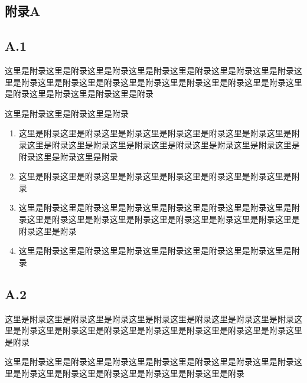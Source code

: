 \documentclass[UTF8,12pt,a4paper]{ctexart}
\begin{document}
\begin{appendices}
	\renewcommand{\appendixname}{附录}
	\appendixtitleon
	\section{附录A}
	\subsection*{A.1}

	这里是附录这里是附录这里是附录这里是附录这里是附录这里是附录这里是附录这里是附录这里是附录这里是附录这里是附录这里是附录这里是附录这里是附录这里是附录这里是附录这里是附录这里是附录

	这里是附录这里是附录这里是附录
	\begin{enumerate}
		\item 这里是附录这里是附录这里是附录这里是附录这里是附录这里是附录这里是附录这里是附录这里是附录这里是附录这里是附录这里是附录这里是附录这里是附录这里是附录这里是附录
		
		\item 这里是附录这里是附录这里是附录这里是附录这里是附录这里是附录这里是附录
		
		\item 这里是附录这里是附录这里是附录这里是附录这里是附录这里是附录这里是附录这里是附录这里是附录这里是附录这里是附录这里是附录这里是附录这里是附录这里是附录
		
		\item 这里是附录这里是附录这里是附录这里是附录这里是附录这里是附录这里是附录
	\end{enumerate}

	\subsection*{A.2}
	这里是附录这里是附录这里是附录这里是附录这里是附录这里是附录这里是附录这里是附录这里是附录这里是附录这里是附录这里是附录这里是附录这里是附录这里是附录
	
	这里是附录这里是附录这里是附录这里是附录这里是附录这里是附录这里是附录这里是附录这里是附录这里是附录这里是附录这里是附录这里是附录
\end{appendices}
\end{document}
